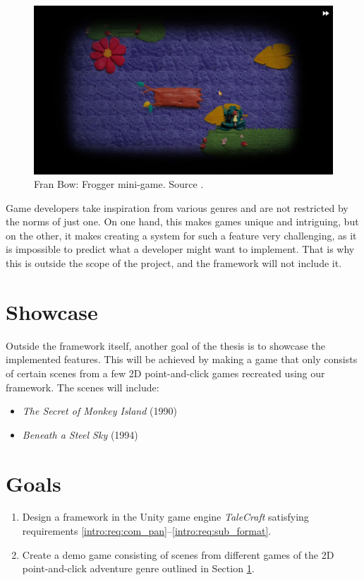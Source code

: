 \begin{figure}[H]
\centering
\includegraphics[width=.8\linewidth]{img/FB_BF2.png}
\caption{Fran Bow: Frogger mini-game. Source \cite{FranBow}.}
\label{fig:UF-FB2}
\end{figure}

\begin{notImplemented}
 \par
\vspace{3mm}
Game developers take inspiration from various genres and are not restricted by the norms of just one. On one hand, this makes games unique and intriguing, but on the other, it makes creating a system for such a feature very challenging, as it is impossible to predict what a developer might want to implement. That is why this is outside the scope of the project, and the framework will not include it. 
\end{notImplemented}


\section{Showcase}
\label{intro:showcase}
Outside the framework itself, another goal of the thesis is to showcase the implemented features. This will be achieved by making a game that only consists of certain scenes from a few 2D point-and-click games recreated using our framework. The scenes will include:
\begin{itemize}
    \item \textit{The Secret of Monkey Island} (1990)
    \item \textit{Beneath a Steel Sky} (1994)
\end{itemize}

\section{Goals}
\label{intro:goals}
\begin{enumerate}[label=\color{orange}\textbf{G{\arabic*}}]
  \item \label{intro:goals:framework} 
  Design a framework in the Unity game engine \textit{TaleCraft} satisfying requirements \ref{intro:req:com_pan}--\ref{intro:req:sub_format}.
  \item \label{intro:goals:demo} Create a demo game consisting of scenes from different games of the 2D point-and-click adventure genre outlined in Section \ref{intro:showcase}.
\end{enumerate}
